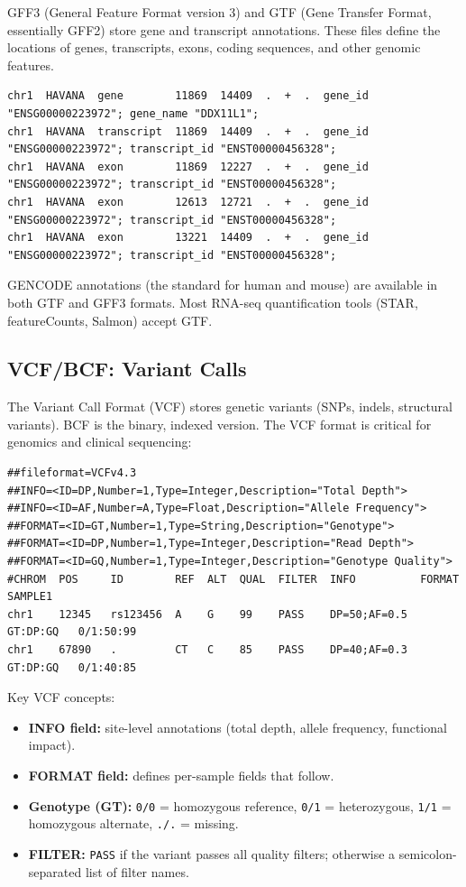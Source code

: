 GFF3 (General Feature Format version 3) and GTF (Gene Transfer Format, essentially GFF2) store gene and transcript annotations. These files define the locations of genes, transcripts, exons, coding sequences, and other genomic features.

\begin{lstlisting}[caption={GTF format example (GENCODE).},label=lst:gtf]
chr1  HAVANA  gene        11869  14409  .  +  .  gene_id "ENSG00000223972"; gene_name "DDX11L1";
chr1  HAVANA  transcript  11869  14409  .  +  .  gene_id "ENSG00000223972"; transcript_id "ENST00000456328";
chr1  HAVANA  exon        11869  12227  .  +  .  gene_id "ENSG00000223972"; transcript_id "ENST00000456328";
chr1  HAVANA  exon        12613  12721  .  +  .  gene_id "ENSG00000223972"; transcript_id "ENST00000456328";
chr1  HAVANA  exon        13221  14409  .  +  .  gene_id "ENSG00000223972"; transcript_id "ENST00000456328";
\end{lstlisting}

GENCODE annotations (the standard for human and mouse) are available in both GTF and GFF3 formats. Most RNA-seq quantification tools (STAR, featureCounts, Salmon) accept GTF.

\subsection{VCF/BCF: Variant Calls}
\label{subsec:bioinf:vcf}

The Variant Call Format (VCF) stores genetic variants (SNPs, indels, structural variants). BCF is the binary, indexed version. The VCF format is critical for genomics and clinical sequencing:

\begin{lstlisting}[caption={VCF format example with key fields.},label=lst:vcf]
##fileformat=VCFv4.3
##INFO=<ID=DP,Number=1,Type=Integer,Description="Total Depth">
##INFO=<ID=AF,Number=A,Type=Float,Description="Allele Frequency">
##FORMAT=<ID=GT,Number=1,Type=String,Description="Genotype">
##FORMAT=<ID=DP,Number=1,Type=Integer,Description="Read Depth">
##FORMAT=<ID=GQ,Number=1,Type=Integer,Description="Genotype Quality">
#CHROM  POS     ID        REF  ALT  QUAL  FILTER  INFO          FORMAT     SAMPLE1
chr1    12345   rs123456  A    G    99    PASS    DP=50;AF=0.5  GT:DP:GQ   0/1:50:99
chr1    67890   .         CT   C    85    PASS    DP=40;AF=0.3  GT:DP:GQ   0/1:40:85
\end{lstlisting}

Key VCF concepts:
\begin{itemize}[itemsep=2pt]
  \item \textbf{INFO field:} site-level annotations (total depth, allele frequency, functional impact).
  \item \textbf{FORMAT field:} defines per-sample fields that follow.
  \item \textbf{Genotype (GT):} \texttt{0/0} = homozygous reference, \texttt{0/1} = heterozygous, \texttt{1/1} = homozygous alternate, \texttt{./.} = missing.
  \item \textbf{FILTER:} \texttt{PASS} if the variant passes all quality filters; otherwise a semicolon-separated list of filter names.
\end{itemize}

